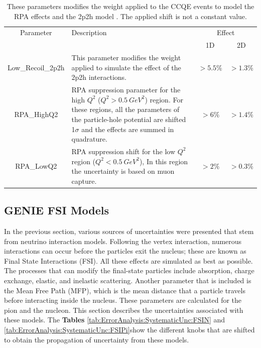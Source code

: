 \begin{table}[!htb]
    \centering
    \begin{tabular}{c|p{2in}|c|c}
        \hline 
        Parameter & Description  & \multicolumn{2}{c}{Effect} \\
         & & 1D & 2D \\
        \hline  
        Low\_Recoil\_2p2h & This parameter modifies the weight applied to simulate the effect of the 2p2h interactions. & $>5.5\%$ & $>1.3\%$ \\ \hline
        RPA\_HighQ2 & RPA suppression parameter for the high $Q^2$ ($Q^2 > 0.5\ GeV^2$) region. For these regions, all the parameters of the particle-hole potential are shifted 1$\sigma$ and the effects are summed in quadrature. & $>6\%$ & $>1.4\%$ \\ \hline
        RPA\_LowQ2 & RPA suppression shift for the low $Q^2$ region ($Q^2 < 0.5\ GeV^2$), In this region the uncertainty is based on muon capture. & $>2\%$ & $>0.3\%$ \\ \hline 
    \end{tabular}
    \caption{These parameters modifies the weight applied to the CCQE events to model the RPA effects \cite{RPAgran2017model} and the 2p2h model \cite{2p2hRodrigues_2016}. The applied shift is not a constant value.}
    \label{tab:ErrorAnalysis:SystematicUnc:MnvTune}
\end{table}



\pagebreak
\subsection{GENIE FSI Models}
\label{Cap:ErrorAnalysis:SystematicUnc:GenieFSINucleons}
In the previous section, various sources of uncertainties were presented that stem from neutrino interaction models. Following the vertex interaction, numerous interactions can occur before the particles exit the nucleus; these are known as Final State Interactions (FSI). All these effects are simulated as best as possible. The processes that can modify the final-state particles include absorption, charge exchange, elastic, and inelastic scattering. Another parameter that is included is the Mean Free Path (MFP), which is the mean distance that a particle travels before interacting inside the nucleus. These parameters are calculated for the pion and the nucleon. This section describes the uncertainties associated with these models. The \textbf{Tables} \ref{tab:ErrorAnalysis:SystematicUnc:FSIN}  and \ref{tab:ErrorAnalysis:SystematicUnc:FSIPi}show the different knobs that are shifted to obtain the propagation of uncertainty from these models. 


